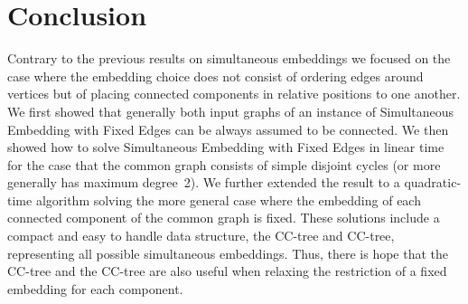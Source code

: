 \documentclass{scrartcl}
\def\arXiv{}
\newcommand{\1}[1]{{\normalfont \ensuremath{#1^{\tiny\circled{1}}}}} \newcommand{\2}[1]{{\normalfont \ensuremath{#1^{\tiny\circled{2}}}}} \renewcommand{\k}[1]{{\normalfont \ensuremath{#1^{\tiny\circled{k}}}}} \newcommand{\proj}[2]{\ensuremath{\left.#1\right|_{#2}}} \newcommand{\eps}{\varepsilon}
\theoremstyle{plain} \newtheorem{theorem}{Theorem} \newcounter{lemmacounter} \setcounter{lemmacounter}{0} \newtheorem{lemma}[lemmacounter]{Lemma} \newtheorem{fact}{Fact}  \newtheorem{corollary}{Corollary} \theoremstyle{definition} \newtheorem{definition}{Definition}
\begin{document}
\section{Conclusion}
\label{sec:conclusion}

Contrary to the previous results on simultaneous embeddings we focused
on the case where the embedding choice does not consist of ordering
edges around vertices but of placing connected components in relative
positions to one another.  We first showed that generally both input
graphs of an instance of {\sc Simultaneous Embedding with Fixed Edges}
can be always assumed to be connected.  We then showed how to solve
{\sc Simultaneous Embedding with Fixed Edges} in linear time for the
case that the common graph consists of simple disjoint cycles (or more
generally has maximum degree~2).  We further extended the result to a
quadratic-time algorithm solving the more general case where the
embedding of each connected component of the common graph is fixed.
These solutions include a compact and easy to handle data structure,
the CC-tree and CC-tree, representing all possible
simultaneous embeddings.  Thus, there is hope that the CC-tree and the
CC-tree are also useful when relaxing the restriction of a
fixed embedding for each component.

\ifdefined\elsevier

\fi
\ifdefined\arXiv

\fi

\end{document}
